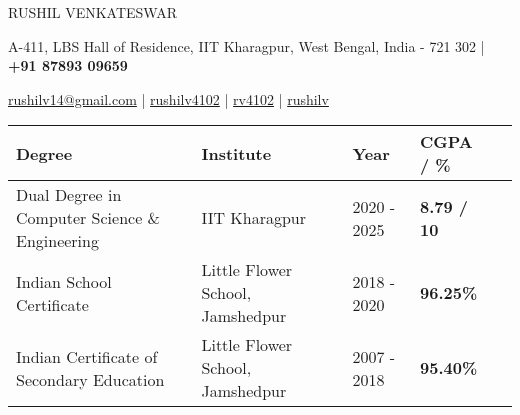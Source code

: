 \documentclass[10pt]{article}
\begin{document}
\begin{center}
    {\Huge RUSHIL VENKATESWAR}\\
\end{center}

\vspace{-2ex}

\begin{center}
    \small A-411, LBS Hall of Residence, IIT Kharagpur, West Bengal, India - 721 302 | 
    \faMobile\hspace{0.2ex} \textbf{+91 87893 09659}
\end{center}

\vspace{-2.5ex}

\begin{center}
    \Letter\hspace{0.2ex}\href{mailto:rushilv14@gmail.com}{\small rushilv14@gmail.com} | 
    \faLinkedinSquare\hspace{0.2ex} \href{https://www.linkedin.com/in/rushilv4102/}{\small rushilv4102} | 
    \faGithub\hspace{0.2ex} \href{https://github.com/rv4102/}{\small rv4102} |
    \faCode\hspace{0.2ex} \href{http://cse.iitkgp.ac.in/~rushilv/}{\small rushilv} 
\end{center}

\vspace{-2.5ex}
{\color{headliner} \spacedhrule{0.2ex}{2.0ex}}

\vspace{-1ex}
\renewcommand{\arraystretch}{1.5}
\begin{center}
    \indent \begin{tabular}{ |@{\hskip 0.115in}l @{\hskip 0.115in} |@{\hskip 0.115in}l @{\hskip 0.115in} |@{\hskip 0.115in}l @{\hskip 0.115in} |@{\hskip 0.115in}l @{\hskip 0.115in} |l }
    \hline \textbf{Degree} & \textbf{Institute} & \textbf{Year} & \textbf{CGPA / \%} \\ 
    \hline {Dual Degree} in Computer Science \& Engineering & IIT Kharagpur  & 2020 - 2025 &          \textbf{8.79 / 10}\\
    \hline Indian School Certificate & Little Flower School, Jamshedpur & 2018 - 2020 &  \textbf{96.25\%} \\
    \hline Indian Certificate of Secondary Education & Little Flower School, Jamshedpur & 2007 - 2018 &  \textbf{95.40\% } \\
    \hline
    \end{tabular}
\end{center}
\\
\end{document}
